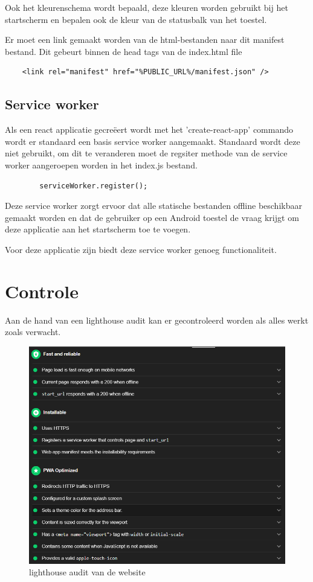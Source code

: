 		Ook het kleurenschema wordt bepaald, deze kleuren worden gebruikt bij het startscherm en bepalen ook de kleur van de statusbalk van het toestel. 
		
		Er moet een link gemaakt worden van de html-bestanden naar dit manifest bestand. Dit gebeurt binnen de head tags van de index.html file
		
\begin{lstlisting}
	<link rel="manifest" href="%PUBLIC_URL%/manifest.json" />
\end{lstlisting}
		
		
	\subsection{Service worker}
		
		Als een react applicatie gecreëert wordt met het 'create-react-app' commando wordt er standaard een basis service worker aangemaakt. Standaard wordt deze niet gebruikt, om dit te veranderen moet de regsiter methode van de service worker aangeroepen worden in het index.js bestand.
		
\begin{lstlisting}
		serviceWorker.register();
\end{lstlisting}
		
		Deze service worker zorgt ervoor dat alle statische bestanden offline beschikbaar gemaakt worden en dat de gebruiker op een Android toestel de vraag krijgt om deze applicatie aan het startscherm toe te voegen.
		
		Voor deze applicatie zijn biedt deze service worker genoeg functionaliteit.
		

\section{Controle}

	Aan de hand van een lighthouse audit kan er gecontroleerd worden als alles werkt zoals verwacht.
	
	\begin{figure}[H]
		\centering
		\includegraphics{./img/lighthouse_dart.png}{}
		\caption{lighthouse audit van de website}
	\end{figure}


